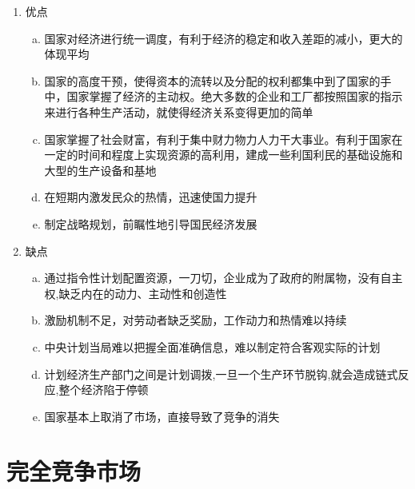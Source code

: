 \documentclass[12pt]{book}
\begin{document}
\begin{enumerate}[1.]
\begin{enumerate}[(1)]
              \item 优点
                    \begin{enumerate}[a.]
                        \item 国家对经济进行统一调度，有利于经济的稳定和收入差距的减小，更大的体现平均
                        \item 国家的高度干预，使得资本的流转以及分配的权利都集中到了国家的手中，国家掌握了经济的主动权。绝大多数的企业和工厂都按照国家的指示来进行各种生产活动，就使得经济关系变得更加的简单
                        \item 国家掌握了社会财富，有利于集中财力物力人力干大事业。有利于国家在一定的时间和程度上实现资源的高利用，建成一些利国利民的基础设施和大型的生产设备和基地
                        \item 在短期内激发民众的热情，迅速使国力提升
                        \item 制定战略规划，前瞩性地引导国民经济发展
                    \end{enumerate}
              \item 缺点
                    \begin{enumerate}[a.]
                        \item 通过指令性计划配置资源，一刀切，企业成为了政府的附属物，没有自主权,缺乏内在的动力、主动性和创造性
                        \item 激励机制不足，对劳动者缺乏奖励，工作动力和热情难以持续
                        \item 中央计划当局难以把握全面准确信息，难以制定符合客观实际的计划
                        \item 计划经济生产部门之间是计划调拨,一旦一个生产环节脱钩,就会造成链式反应,整个经济陷于停顿
                        \item 国家基本上取消了市场，直接导致了竞争的消失
                    \end{enumerate}

          \end{enumerate}
\end{enumerate}















\section{完全竞争市场}
\end{document}
